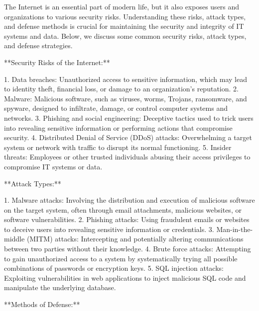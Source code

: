 \documentclass{article}
\begin{document}
The Internet is an essential part of modern life, but it also exposes users and organizations to various security risks. Understanding these risks, attack types, and defense methods is crucial for maintaining the security and integrity of IT systems and data. Below, we discuss some common security risks, attack types, and defense strategies.

**Security Risks of the Internet:**

1. Data breaches: Unauthorized access to sensitive information, which may lead to identity theft, financial loss, or damage to an organization's reputation.
2. Malware: Malicious software, such as viruses, worms, Trojans, ransomware, and spyware, designed to infiltrate, damage, or control computer systems and networks.
3. Phishing and social engineering: Deceptive tactics used to trick users into revealing sensitive information or performing actions that compromise security.
4. Distributed Denial of Service (DDoS) attacks: Overwhelming a target system or network with traffic to disrupt its normal functioning.
5. Insider threats: Employees or other trusted individuals abusing their access privileges to compromise IT systems or data.

**Attack Types:**

1. Malware attacks: Involving the distribution and execution of malicious software on the target system, often through email attachments, malicious websites, or software vulnerabilities.
2. Phishing attacks: Using fraudulent emails or websites to deceive users into revealing sensitive information or credentials.
3. Man-in-the-middle (MITM) attacks: Intercepting and potentially altering communications between two parties without their knowledge.
4. Brute force attacks: Attempting to gain unauthorized access to a system by systematically trying all possible combinations of passwords or encryption keys.
5. SQL injection attacks: Exploiting vulnerabilities in web applications to inject malicious SQL code and manipulate the underlying database.

**Methods of Defense:**
\end{document}

